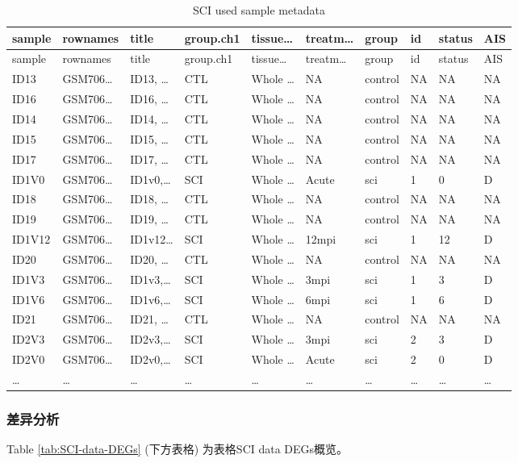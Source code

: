 \documentclass[
]{article}
\begin{document}
\begin{longtable}[]{@{}llllllllll@{}}
\caption{\label{tab:SCI-used-sample-metadata}SCI used sample metadata}\tabularnewline
\toprule
sample & rownames & title & group.ch1 & tissue\ldots{} & treatm\ldots{} & group & id & status & AIS\tabularnewline
\midrule
\endfirsthead
\toprule
sample & rownames & title & group.ch1 & tissue\ldots{} & treatm\ldots{} & group & id & status & AIS\tabularnewline
\midrule
\endhead
ID13 & GSM706\ldots{} & ID13, \ldots{} & CTL & Whole \ldots{} & NA & control & NA & NA & NA\tabularnewline
ID16 & GSM706\ldots{} & ID16, \ldots{} & CTL & Whole \ldots{} & NA & control & NA & NA & NA\tabularnewline
ID14 & GSM706\ldots{} & ID14, \ldots{} & CTL & Whole \ldots{} & NA & control & NA & NA & NA\tabularnewline
ID15 & GSM706\ldots{} & ID15, \ldots{} & CTL & Whole \ldots{} & NA & control & NA & NA & NA\tabularnewline
ID17 & GSM706\ldots{} & ID17, \ldots{} & CTL & Whole \ldots{} & NA & control & NA & NA & NA\tabularnewline
ID1V0 & GSM706\ldots{} & ID1v0,\ldots{} & SCI & Whole \ldots{} & Acute & sci & 1 & 0 & D\tabularnewline
ID18 & GSM706\ldots{} & ID18, \ldots{} & CTL & Whole \ldots{} & NA & control & NA & NA & NA\tabularnewline
ID19 & GSM706\ldots{} & ID19, \ldots{} & CTL & Whole \ldots{} & NA & control & NA & NA & NA\tabularnewline
ID1V12 & GSM706\ldots{} & ID1v12\ldots{} & SCI & Whole \ldots{} & 12mpi & sci & 1 & 12 & D\tabularnewline
ID20 & GSM706\ldots{} & ID20, \ldots{} & CTL & Whole \ldots{} & NA & control & NA & NA & NA\tabularnewline
ID1V3 & GSM706\ldots{} & ID1v3,\ldots{} & SCI & Whole \ldots{} & 3mpi & sci & 1 & 3 & D\tabularnewline
ID1V6 & GSM706\ldots{} & ID1v6,\ldots{} & SCI & Whole \ldots{} & 6mpi & sci & 1 & 6 & D\tabularnewline
ID21 & GSM706\ldots{} & ID21, \ldots{} & CTL & Whole \ldots{} & NA & control & NA & NA & NA\tabularnewline
ID2V3 & GSM706\ldots{} & ID2v3,\ldots{} & SCI & Whole \ldots{} & 3mpi & sci & 2 & 3 & D\tabularnewline
ID2V0 & GSM706\ldots{} & ID2v0,\ldots{} & SCI & Whole \ldots{} & Acute & sci & 2 & 0 & D\tabularnewline
\ldots{} & \ldots{} & \ldots{} & \ldots{} & \ldots{} & \ldots{} & \ldots{} & \ldots{} & \ldots{} & \ldots{}\tabularnewline
\bottomrule
\end{longtable}

\hypertarget{ux5deeux5f02ux5206ux6790}{%
\subsubsection{差异分析}\label{ux5deeux5f02ux5206ux6790}}

Table \ref{tab:SCI-data-DEGs} (下方表格) 为表格SCI data DEGs概览。
\end{document}
